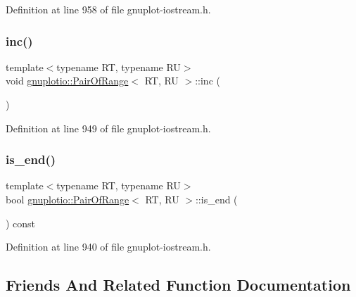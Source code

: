Definition at line 958 of file gnuplot-\/iostream.\+h.

\mbox{\label{classgnuplotio_1_1_pair_of_range_adbb8ab0fb9f7245262041dd20444b96a}} 
\subsubsection{\texorpdfstring{inc()}{inc()}}
{\footnotesize\ttfamily template$<$typename RT, typename RU$>$ \\
void \hyperlink{classgnuplotio_1_1_pair_of_range}{gnuplotio\+::\+Pair\+Of\+Range}$<$ RT, RU $>$\+::inc (\begin{DoxyParamCaption}{ }\end{DoxyParamCaption})\hspace{0.3cm}{\ttfamily [inline]}}



Definition at line 949 of file gnuplot-\/iostream.\+h.

\mbox{\label{classgnuplotio_1_1_pair_of_range_af9c705aa88e6366910e279674961ff79}} 
\subsubsection{\texorpdfstring{is\+\_\+end()}{is\_end()}}
{\footnotesize\ttfamily template$<$typename RT, typename RU$>$ \\
bool \hyperlink{classgnuplotio_1_1_pair_of_range}{gnuplotio\+::\+Pair\+Of\+Range}$<$ RT, RU $>$\+::is\+\_\+end (\begin{DoxyParamCaption}{ }\end{DoxyParamCaption}) const\hspace{0.3cm}{\ttfamily [inline]}}



Definition at line 940 of file gnuplot-\/iostream.\+h.



\subsection{Friends And Related Function Documentation}
\mbox{\label{classgnuplotio_1_1_pair_of_range_aada62f803432f04aff66f3c609329520}} 
